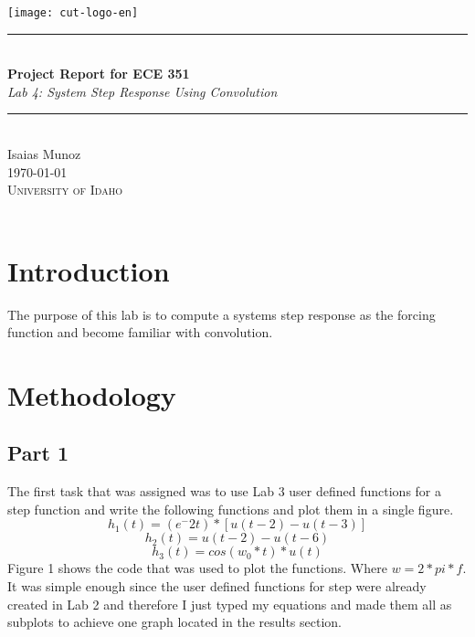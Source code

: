 \documentclass[12pt,a4paper]{article}
\newcommand{\HRule}{\rule{\linewidth}{0.5mm}}
\begin{document}
\begin{titlepage}
\begin{center}
\texttt{[image: cut-logo-en]}~\\[2cm]
\HRule \\[0.4cm]
{ \LARGE 
  \textbf{Project Report for ECE 351}\\[0.4cm]
  \emph{Lab 4: System Step Response Using Convolution}\\[0.4cm]
}
\HRule \\[1.5cm]
{ \large
  Isaias Munoz  \\[0.1cm]
  \today\\[0.1cm]
}
\vfill
\textsc{\Large University of Idaho}\\
\\
 
\end{center}
\end{titlepage}
\newpage
\tableofcontents
{}
\newpage
\setcounter{page}{1}
\section{Introduction}\label{sec:intro}

The purpose of this lab is to compute a systems step response as the forcing function and become familiar with convolution.






\section{Methodology}\label{sec:meth}
\subsection{Part 1}
The first task that was assigned was to use Lab 3 user defined functions for a step function and write the following functions and plot them in a single figure.
\[h_1(t)=(e^-2t)*[u(t-2)-u(t-3)]\] 
\[h_2(t)=u(t-2)-u(t-6)\] 
\[h_3(t)=cos(w_0*t)*u(t)\] 
Figure 1 shows the code that was used to plot the functions. Where $w=2*pi*f$.  It was simple enough since the user defined functions for step were already created in Lab 2 and therefore I just typed my equations and made them all as subplots to achieve one graph located in the results section. 
\end{document}
